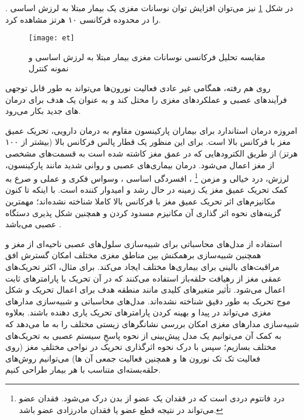 \cite{weisz2005tinnitus, weisz2007neural, dohrmann2007tuning, adamchic2014reversing, lorenz2009loss}.  
 در شکل
\ref{fig:et-time-freq-analysis}
نیز می‌توان افزایش توان نوسانات مغزی یک بیمار مبتلا به لرزش اساسی را در محدوده فرکانسی ۱۰ هرتز مشاهده کرد.
\begin{figure}[t!]
     \centering
     \texttt{[image: et]}
     \caption{مقایسه تحلیل فرکانسی نوسانات مغزی بیمار مبتلا به لرزش اساسی و نمونه کنترل }
     \label{fig:et-time-freq-analysis}
\end{figure}
   روی هم رفته، همگامی غیر عادی فعالیت نورون‌ها می‌تواند به طور قابل توجهی فرآیندهای عصبی و عملکردهای مغزی را مختل کند و به عنوان یک هدف برای درمان های جدید بکار می‌رود.


امروزه درمان استاندارد برای بیماران پارکینسون مقاوم به درمان دارویی، تحریک عمیق مغز با فرکانس بالا
است. برای این منظور یک قطار پالس فرکانس بالا (بیشتر از ۱۰۰ هرتز) از طریق الکترودهایی که در عمق مغز کاشته شده است به قسمت‌های مشخصی از مغز اعمال می‌شود. درمان بیماری‌های عصبی و روانی شدید مانند پارکینسون، لرزش، درد خیالی و مزمن
\footnote{درد فانتوم دردی است که در فقدان یک عضو از بدن درک می‌شود. فقدان عضو می‌تواند در نتیجه قطع عضو یا فقدان مادرزادی عضو باشد.}
، افسردگی اساسی
، وسواس فکری و عملی
 و صرع به کمک تحریک عمیق مغز یک زمینه در حال رشد و امیدوار کننده است. با اینکه تا کنون مکانیزم‌های اثر تحریک عمیق مغز با فرکانس بالا کاملا شناخته نشده‌اند؛
مهمترین گزینه‌های نحوه اثر گذاری آن مکانیزم مسدود کردن
و همچنین شکل پذیری دستگاه عصبی می‌باشد
\cite{benabid2005putative}.

استفاده از مدل‌های محاسباتی برای شبیه‌سازی سلول‌های عصبی ناحیه‌ای از مغز 
و همچنین شبیه‌سازی برهمکنش  بین مناطق مغزی مختلف امکان گسترش افق مراقبت‌های بالینی برای بیماری‌ها
 مختلف ایجاد می‌کند. برای مثال، اکثر تحریک‌های عمقی مغز از رهیافت حلقه‌باز
استفاده می‌کنند که در آن تحریک با پارامترهای ثابت اعمال می‌شود. تأثیر متغیرهای کلیدی مانند منطقه هدف برای اعمال تحریک و شکل موج تحریک به طور دقیق شناخته نشده‌اند.
مدل‌های محاسباتی و شبیه‌سازی مدارهای مغزی می‌تواند در پیدا و بهینه کردن پارامترهای تحریک یاری دهنده باشند. بعلاوه شبیه‌سازی مدارهای مغزی امکان بررسی نشانگرهای زیستی مختلف را به ما می‌دهد که به کمک آن می‌توانیم یک مدل پیش‌بینی از نحوه پاسخِ سیستم عصبی به تحریک‌های مختلف بسازیم؛ سپس با درک نحوه اثرگذاری تحریک در نواحی مختلفِ مغز (روی فعالیت تک تک نورون ها و همچنین فعالیت جمعی آن ها) می‌توانیم روش‌های حلقه‌بسته‌ای
متناسب با هر بیمار طراحی کنیم. 

